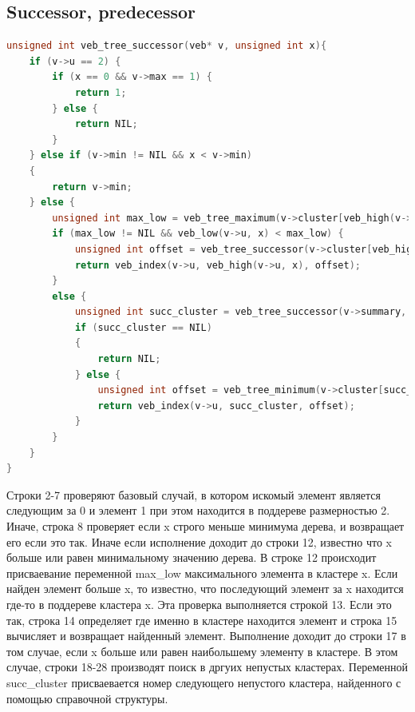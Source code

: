 \documentclass{article}
\begin{document}
\subsection{Successor, predecessor}
\begin{lstlisting}[language=C,style=C]
unsigned int veb_tree_successor(veb* v, unsigned int x){
    if (v->u == 2) {
        if (x == 0 && v->max == 1) {
            return 1;
        } else {
            return NIL;
        }
    } else if (v->min != NIL && x < v->min)
    {
        return v->min;
    } else {
        unsigned int max_low = veb_tree_maximum(v->cluster[veb_high(v->u,x)]);
        if (max_low != NIL && veb_low(v->u, x) < max_low) {
            unsigned int offset = veb_tree_successor(v->cluster[veb_high(v->u, x)], veb_low(v->u,x));
            return veb_index(v->u, veb_high(v->u, x), offset);
        }
        else {
            unsigned int succ_cluster = veb_tree_successor(v->summary, veb_high(v->u,x));
            if (succ_cluster == NIL)
            {
                return NIL;
            } else {
                unsigned int offset = veb_tree_minimum(v->cluster[succ_cluster]);
                return veb_index(v->u, succ_cluster, offset);
            }
        }
    }
}
\end{lstlisting}
Строки 2-7 проверяют базовый случай, в котором искомый элемент является следующим за 0 и элемент 1 при этом находится в поддереве размерностью 2. Иначе, строка 8 проверяет если x строго меньше минимума дерева, и возвращает его если это так.
Иначе если исполнение доходит до строки 12, известно что x больше или равен минимальному значению дерева. В строке 12 происходит присваевание переменной max\_low максимального элемента в кластере x. Если найден элемент больше x, то известно, что последующий элемент за x находится где-то в поддереве кластера x. Эта проверка выполняется строкой 13. Если это так, строка 14 определяет где именно в кластере находится элемент и строка 15 вычисляет и возвращает найденный элемент.
Выполнение доходит до строки 17 в том случае, если x больше или равен наибольшему элементу в кластере. В этом случае, строки 18-28 производят поиск в дргуих непустых кластерах. Переменной succ\_cluster присваевается номер следующего непустого кластера, найденного с помощью справочной структуры.
\end{document}
